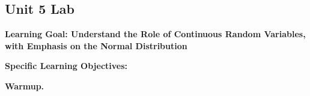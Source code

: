 \cleardoublepage
\subsection{Unit 5 Lab}
\textbf{Learning Goal: Understand the Role of Continuous Random Variables, with Emphasis on the Normal Distribution} 

\textbf{Specific Learning Objectives:}


\textbf{Warmup.}


